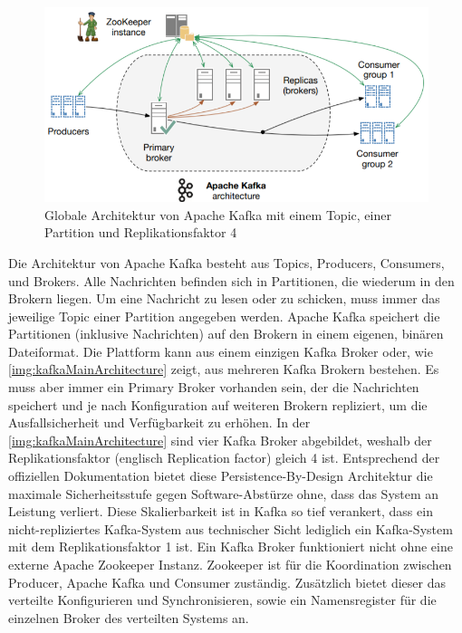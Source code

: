 \documentclass[a4paper,titlepage,halfparskip,12pt]{scrreprt}
\begin{document}
\begin{onehalfspacing}
\begin{figure}[h]
	\centering
	\includegraphics[width=\textwidth]{images/kafkaMainArchitecture}
	\caption{Globale Architektur von Apache Kafka mit einem Topic, einer Partition und Replikationsfaktor 4 \cite{nannoniDissKafka}}
	\label{img:kafkaMainArchitecture}
\end{figure}

Die Architektur von Apache Kafka besteht aus Topics, Producers, Consumers, und Brokers. Alle Nachrichten befinden sich in Partitionen, die wiederum in den Brokern liegen.
Um eine Nachricht zu lesen oder zu schicken, muss immer das jeweilige Topic einer Partition angegeben werden.
Apache Kafka speichert die Partitionen (inklusive Nachrichten) auf den Brokern in einem eigenen, binären Dateiformat. Die Plattform kann aus einem einzigen Kafka Broker oder, wie \autoref{img:kafkaMainArchitecture} zeigt, aus mehreren Kafka Brokern bestehen. Es muss aber immer ein Primary Broker vorhanden sein, der die Nachrichten speichert und je nach Konfiguration auf weiteren Brokern repliziert, um die Ausfallsicherheit und Verfügbarkeit zu erhöhen. In der \autoref{img:kafkaMainArchitecture} sind vier Kafka Broker abgebildet, weshalb der Replikationsfaktor (englisch Replication factor) gleich 4 ist. Entsprechend der offiziellen Dokumentation bietet diese Persistence-By-Design Architektur die maximale Sicherheitsstufe gegen Software-Abstürze ohne, dass das System an Leistung verliert. Diese Skalierbarkeit ist in Kafka so tief verankert, dass ein nicht-repliziertes Kafka-System aus technischer Sicht lediglich ein Kafka-System mit dem Replikationsfaktor 1 ist. Ein Kafka Broker funktioniert nicht ohne eine externe Apache Zookeeper Instanz. Zookeeper ist für die Koordination zwischen Producer, Apache Kafka und Consumer zuständig. Zusätzlich bietet dieser das verteilte Konfigurieren und Synchronisieren, sowie ein Namensregister für die einzelnen Broker des verteilten Systems an.\cite{nannoniDissKafka}


\end{onehalfspacing}
\end{document}

